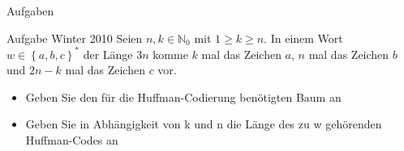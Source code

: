 \begin{frame}{Aufgaben}
    \begin{exampleblock}{Aufgabe Winter 2010}
        Seien $n,k \in \mathbb{N}_0$ mit $1\geq k \geq n$. In einem Wort $w\in \left\{ a,b,c \right\}^*$ der Länge $3n$ komme $k$ mal das Zeichen $a$, $n$ mal das Zeichen $b$ und $2n-k$ mal das Zeichen $c$ vor.
        \begin{itemize}
            \item Geben Sie den für die Huffman-Codierung benötigten Baum an
            \item Geben Sie in Abhängigkeit von k und n die Länge des zu w gehörenden Huffman-Codes an
        \end{itemize}
    \end{exampleblock}
\end{frame}

